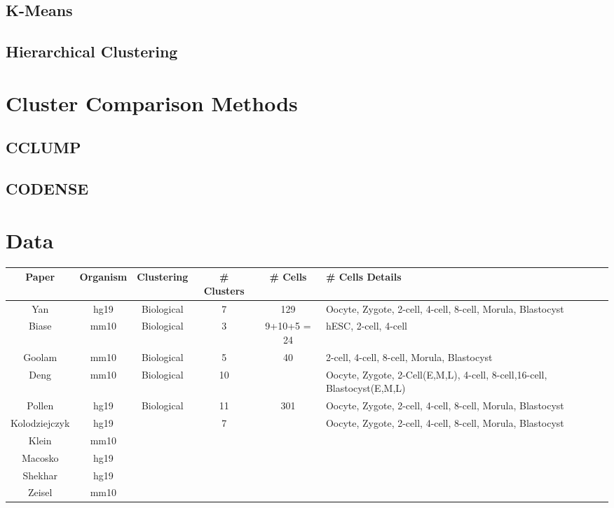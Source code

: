 \documentclass[11pt]{article}
\begin{document}
\subsection{K-Means}
\subsection{Hierarchical Clustering}


\section{Cluster Comparison Methods}

\subsection{CCLUMP}

\subsection{CODENSE}

\section{Data}
\begin{tabular}{ | c | c | c | c | c | p{6cm} | }
\hline
\textbf{Paper} & \textbf{Organism} & \textbf{Clustering} & \textbf{\# Clusters}& \textbf{\# Cells }& \textbf{\# Cells} \textbf{Details}\\
\hline
Yan & hg19 & Biological & 7 & 129 & Oocyte, Zygote, 2-cell, 4-cell, 8-cell, Morula, Blastocyst\\
\hline
Biase & mm10 & Biological & 3 & 9+10+5 = 24& hESC, 2-cell, 4-cell\\
\hline
Goolam & mm10 & Biological & 5 & 40 & 2-cell, 4-cell, 8-cell, Morula, Blastocyst\\
\hline
Deng & mm10 & Biological & 10 &  & Oocyte, Zygote, 2-Cell(E,M,L), 4-cell, 8-cell,16-cell, Blastocyst(E,M,L)\\
\hline
Pollen & hg19 & Biological & 11 &  301 & Oocyte, Zygote, 2-cell, 4-cell, 8-cell, Morula, Blastocyst\\
\hline
Kolodziejczyk & hg19 & & 7 &  & Oocyte, Zygote, 2-cell, 4-cell, 8-cell, Morula, Blastocyst\\
\hline
Klein & mm10 & & &  & \\
\hline
Macosko & hg19 & &  &  & \\
\hline
Shekhar & hg19 & &  &  & \\
\hline
Zeisel & mm10 & &  &  & \\
\hline

\end{tabular}
\end{document}
